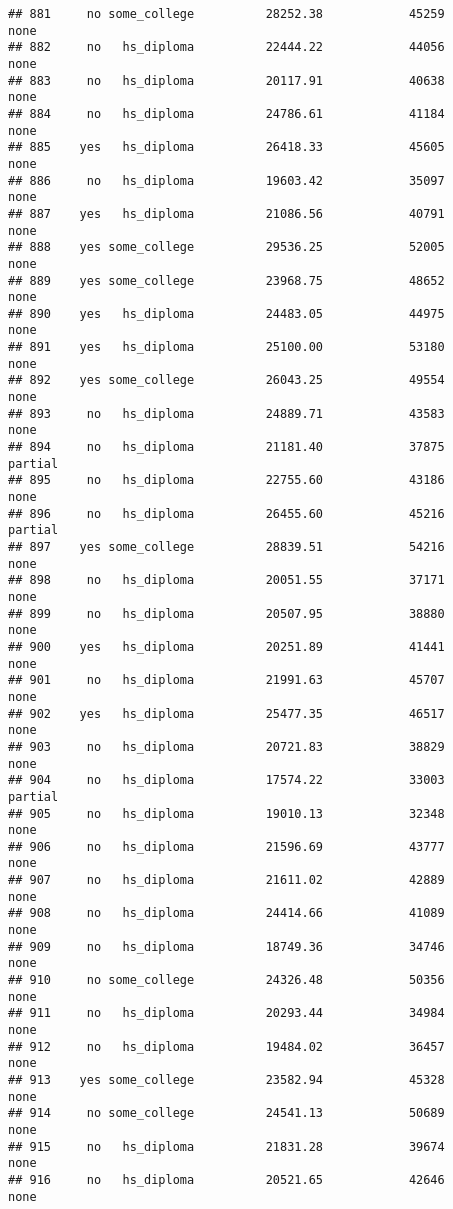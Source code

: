\documentclass[
]{article}
\begin{document}
\begin{verbatim}
## 881     no some_college          28252.38            45259        none
## 882     no   hs_diploma          22444.22            44056        none
## 883     no   hs_diploma          20117.91            40638        none
## 884     no   hs_diploma          24786.61            41184        none
## 885    yes   hs_diploma          26418.33            45605        none
## 886     no   hs_diploma          19603.42            35097        none
## 887    yes   hs_diploma          21086.56            40791        none
## 888    yes some_college          29536.25            52005        none
## 889    yes some_college          23968.75            48652        none
## 890    yes   hs_diploma          24483.05            44975        none
## 891    yes   hs_diploma          25100.00            53180        none
## 892    yes some_college          26043.25            49554        none
## 893     no   hs_diploma          24889.71            43583        none
## 894     no   hs_diploma          21181.40            37875     partial
## 895     no   hs_diploma          22755.60            43186        none
## 896     no   hs_diploma          26455.60            45216     partial
## 897    yes some_college          28839.51            54216        none
## 898     no   hs_diploma          20051.55            37171        none
## 899     no   hs_diploma          20507.95            38880        none
## 900    yes   hs_diploma          20251.89            41441        none
## 901     no   hs_diploma          21991.63            45707        none
## 902    yes   hs_diploma          25477.35            46517        none
## 903     no   hs_diploma          20721.83            38829        none
## 904     no   hs_diploma          17574.22            33003     partial
## 905     no   hs_diploma          19010.13            32348        none
## 906     no   hs_diploma          21596.69            43777        none
## 907     no   hs_diploma          21611.02            42889        none
## 908     no   hs_diploma          24414.66            41089        none
## 909     no   hs_diploma          18749.36            34746        none
## 910     no some_college          24326.48            50356        none
## 911     no   hs_diploma          20293.44            34984        none
## 912     no   hs_diploma          19484.02            36457        none
## 913    yes some_college          23582.94            45328        none
## 914     no some_college          24541.13            50689        none
## 915     no   hs_diploma          21831.28            39674        none
## 916     no   hs_diploma          20521.65            42646        none

\end{verbatim}
\end{document}
